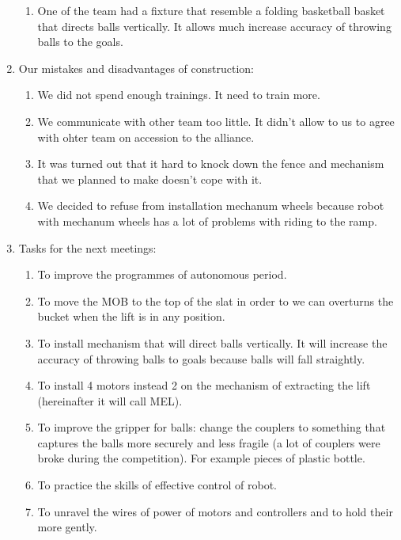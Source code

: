 \begin{enumerate}
\begin{enumerate}
	\item One of the team had a fixture that resemble a folding basketball basket that directs balls vertically. It allows much increase accuracy of throwing balls to the goals.
	
  \end{enumerate}
  
  \item Our mistakes and disadvantages of construction:
  \begin{enumerate}
  	\item We did not spend enough trainings. It need to train  more.
  	
  	\item We communicate with other team too little. It didn't allow to us to agree with ohter team on accession to the alliance.
  	
  	\item It was turned out that it hard to knock down the fence and mechanism that we planned to make doesn't cope with it.
  	
  	\item We decided to refuse from installation mechanum wheels because robot with mechanum wheels has a lot of problems with riding to the ramp.
  	
  \end{enumerate}
  
  \item Tasks for the next meetings:
  \begin{enumerate}
  	\item To improve the programmes of autonomous period.
  	
  	\item To move the MOB to the top of the slat in order to we can overturns the bucket when the lift is in any position.
  	
  	\item To install mechanism that will direct balls vertically. It will increase the accuracy of throwing balls to goals because balls will fall straightly.
  	
  	\item To install 4 motors instead 2 on the mechanism of extracting the lift (hereinafter it will call MEL).
  	
  	\item To improve the gripper for balls: change the couplers to something that captures the balls more securely and less fragile (a lot of couplers were broke during the competition). For example pieces of plastic bottle.
  	
  	\item To practice the skills of effective control of robot.
  	
  	\item To unravel the wires of power of motors and controllers and to hold their more gently.
  	
  \end{enumerate}
  
\end{enumerate}
\fillpage